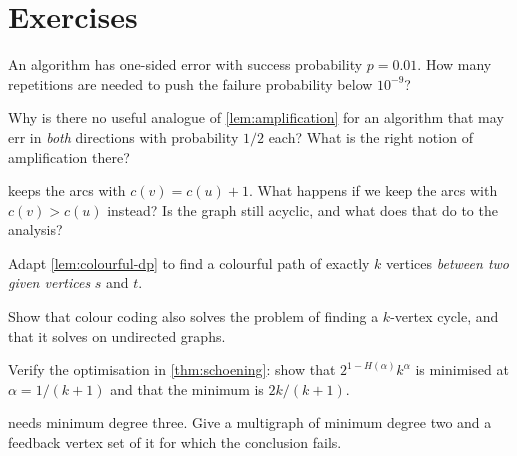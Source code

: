 \section{Exercises}
\label{sec:ex-randomized}

\begin{exercise}
An algorithm has one-sided error with success probability $p = 0.01$. How many
repetitions are needed to push the failure probability below $10^{-9}$?
\end{exercise}

\begin{exercise}
Why is there no useful analogue of \cref{lem:amplification} for an algorithm
that may err in \emph{both} directions with probability $1/2$ each? What is the
right notion of amplification there?
\end{exercise}

\begin{exercise}
 keeps the arcs with $c(v) = c(u)+1$. What happens if
we keep the arcs with $c(v) > c(u)$ instead? Is the graph still acyclic, and
what does that do to the analysis?
\end{exercise}

\begin{exercise}
Adapt \cref{lem:colourful-dp} to find a colourful path of exactly $k$ vertices
\emph{between two given vertices} $s$ and $t$.
\end{exercise}

\begin{exercise}
Show that colour coding also solves the problem of finding a $k$-vertex cycle,
and that it solves  on undirected graphs.
\end{exercise}

\begin{exercise}
Verify the optimisation in \cref{thm:schoening}: show that
$2^{1-H(\alpha)}k^{\alpha}$ is minimised at $\alpha = 1/(k+1)$ and that the
minimum is $2k/(k+1)$.
\end{exercise}

\begin{exercise}
 needs minimum degree three. Give a multigraph of
minimum degree two and a feedback vertex set of it for which the conclusion
fails.
\end{exercise}

